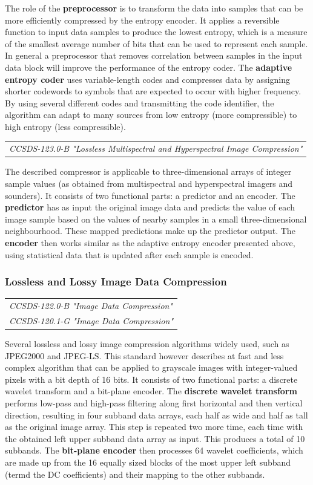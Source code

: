 The role of the \textbf{preprocessor} is to transform the data into samples that can be more efficiently compressed by the entropy encoder. It applies a reversible function to input data samples to produce the lowest entropy, which is a measure of the smallest average number of bits that can be used to represent each sample. In general a preprocessor that removes correlation between samples in the input data block will improve the performance of the entropy coder. The \textbf{adaptive entropy coder} uses variable-length codes and compresses data by assigning shorter codewords to symbols that are expected to occur with higher frequency. By using several different codes and transmitting the code identifier, the algorithm can adapt to many sources from low entropy (more compressible) to high entropy (less compressible).

\begin{tabular}{l}
\textit{CCSDS-123.0-B "Lossless Multispectral and Hyperspectral Image Compression" \cite{CCSDS-123.0-B}}
\end{tabular}

The described compressor is applicable to three-dimensional arrays of integer sample values (as obtained from multispectral and hyperspectral imagers and sounders). It consists of two functional parts: a predictor and an encoder. The \textbf{predictor} has as input the original image data and predicts the value of each image sample based on the values of nearby samples in a small three-dimensional neighbourhood. These mapped predictions make up the predictor output. The \textbf{encoder} then works similar as the adaptive entropy encoder presented above, using statistical data that is updated after each sample is encoded.

\subsubsection{Lossless and Lossy Image Data Compression}

\begin{tabular}{l}
\textit{CCSDS-122.0-B "Image Data Compression" \cite{CCSDS-122.0-B}} \\
\textit{CCSDS-120.1-G "Image Data Compression" \cite{CCSDS-120.1-G}}
\end{tabular}

Several lossless and lossy image compression algorithms widely used, such as JPEG2000 and JPEG-LS. This standard however describes at fast and less complex algorithm that can be applied to grayscale images with integer-valued pixels with a bit depth of 16 bits. It consists of two functional parts: a discrete wavelet transform and a bit-plane encoder. The \textbf{discrete wavelet transform} performs low-pass and high-pass filtering along first horizontal and then vertical direction, resulting in four subband data arrays, each half as wide and half as tall as the original image array. This step is repeated two more time, each time with the obtained left upper subband data array as input. This produces a total of 10 subbands. The \textbf{bit-plane encoder} then processes 64 wavelet coefficients, which are made up from the 16 equally sized blocks of the most upper left subband (termd the DC coefficients) and their mapping to the other subbands.

